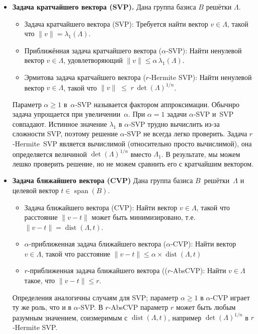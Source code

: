 \begin{itemize}
\item \textbf{Задача кратчайшего вектора (SVP).}
      Дана группа базиса $B$ решётки $\Lambda$.

      \begin{itemize}
          \item Задача кратчайшего вектора (SVP): Требуется найти вектор
              $v\in\Lambda$, такой что $\lVert v\rVert=\lambda_{1}(\Lambda)$.
          \item Приближённая задача кратчайшего вектора ($\alpha$‑SVP): Найти
              ненулевой вектор $v\in\Lambda$, удовлетворяющий
              $\lVert v\rVert\le\alpha\,\lambda_{1}(\Lambda)$.
          \item Эрмитова задача кратчайшего вектора ($r$‑Hermite SVP):
              Найти ненулевой вектор $v\in\Lambda$, такой что
              $\lVert v\rVert \;\le\; r\,\det(\Lambda)^{1/n}$.
      \end{itemize}

      Параметр $\alpha\ge1$ в $\alpha$‑SVP называется фактором аппроксимации.
      Обычнро задача упрощается при увеличении $\alpha$. При $\alpha=1$ задачи
      $\alpha$‑SVP и SVP совпадают. Истинное значение $\lambda_{1}$ в
      $\alpha$‑SVP трудно вычислить из-за сложности SVP, поэтому решение
      $\alpha$‑SVP не всегда легко проверить. Задача $r$‑Hermite SVP является
      вычислимой (относительно просто вычислимой), она определяется величиной
      $\det(\Lambda)^{1/n}$ вместо $\Lambda_1$. В результате, мы можем лешко
      проверить решение, но не можем сравнить его с кратчайшим вектором.

\item \textbf{Задача ближайшего вектора (CVP)}
      Дана группа базиса $B$ решётки $\Lambda$ и целевой вектор
      $t\in\operatorname{span}(B)$.

      \begin{itemize}
          \item Задача ближайшего вектора (CVP): Найти вектор $v\in\Lambda$,
              такой что расстояние $\lVert v - t\rVert$ может быть минимизировано,
              т.е. $\lVert v - t\rVert = \operatorname{dist}(\Lambda,t)$.
          \item $\alpha$-приближенная задача ближайшего вектора ($\alpha$‑CVP):
              Найти вектор $v\in\Lambda$, такой что расстояние
              $\lVert v - t\rVert \le \alpha \times \operatorname{dist}(\Lambda,t)$
          \item $r$-приближенная задача ближайшего вектора (($r$‑AbsCVP):  Найти
              $v\in\Lambda$ такое, что $\lVert v - t\rVert \le r$.
      \end{itemize}

      Определения аналогичны случаям для SVP; параметр $\alpha\ge1$ в
      $\alpha$‑CVP играет ту же роль, что и в $\alpha$‑SVP. В $r$‑AbsCVP
      параметр $r$ может быть любым разумным значением, соизмеримым с
      $\operatorname{dist}(\Lambda,t)$, например $\det(\Lambda)^{1/n}$ в
      $r$‑Hermite SVP.
\end{itemize}

